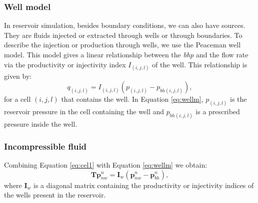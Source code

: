 \documentclass[12pt]{article}
\begin{document}
\subsubsection*{Well model}
\hspace{0.5cm}In reservoir simulation, besides boundary conditions, we can also have sources. They are fluids injected or extracted through wells or through boundaries. 
To describe the injection or production through wells, we use the Peaceman well model. This model gives a linear relationship 
between the \emph{bhp} and the flow rate via the productivity or injectivity index ${I}_{(i,j,l)}$ of the well. This relationship 
is given by: 
\begin{equation}\label{eq:wellm}
{q}_{(i,j,l)}={I}_{(i,j,l)}({p}_{(i,j,l)}-{p}_{bh(i,j,l)}),
\end{equation}
for a cell $(i,j,l)$ that contains the well. In Equation \eqref{eq:wellm}, ${p}_{(i,j,l)}$ is the reservoir pressure in the cell containing the well
and ${p}_{bh(i,j,l)}$ is a prescribed pressure inside the well.
\subsubsection*{Incompressible fluid}
\hspace{0.5cm}Combining Equation \eqref{eq:cel1} with Equation \eqref{eq:wellm} we obtain:
 \begin{equation}\label{eq:celw1}
\mathbf{T}\mathbf{p}^n_{nw} = \mathbf{I}_w(\mathbf{p}^n_{nw}-\mathbf{p}^n_{bh}),
\end{equation}
where $\mathbf{I}_w$ is a diagonal matrix containing the productivity or injectivity indices of the wells present in the reservoir. 
\end{document}
